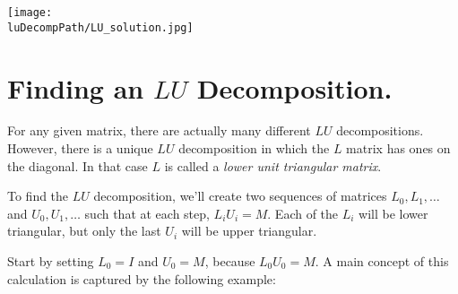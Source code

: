 
\begin{center}
\texttt{[image: \\luDecompPath/LU\_solution.jpg]}
\end{center}

\section{Finding an $LU$ Decomposition.}
\label{finding_LU_decomp}
 
For any given matrix, there are actually many different $LU$ decompositions.  However, there is a unique $LU$ decomposition in which the $L$ matrix has ones on the diagonal. In that case $L$ is called a \emph{lower unit triangular matrix}.

To find the $LU$ decomposition, we'll create two sequences of matrices $L_0, L_1, \ldots$ and $U_0, U_1, \ldots$ such that at each step, $L_iU_i=M$.  Each of the $L_i$ will be lower triangular, but only the last $U_i$ will be upper triangular.

Start by setting $L_0=I$ and $U_0=M$, because $L_0U_0=M$. A main concept of this calculation is captured by the following example:

